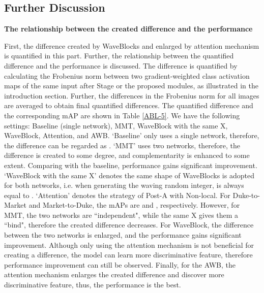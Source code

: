 \documentclass[journal]{IEEEtran}
\begin{document}
\subsection{Further Discussion}
\textbf{The relationship between the created difference and the performance}\par 
First, the difference created by WaveBlocks and enlarged by attention mechanism is quantified in this part.  Further, the relationship between the quantified difference and the performance is discussed. The difference is quantified by calculating the Frobenius norm between two gradient-weighted class activation maps \cite{selvaraju2017grad} of the same input after Stage  or the proposed modules, as illustrated in the introduction section. Further, the differences in the Frobenius norm for all images are averaged to obtain final quantified differences.  The quantified difference and the corresponding mAP are shown in Table  \ref{ABL-5}.  
We have the following settings: Baseline (single network), MMT, WaveBlock with the same X, WaveBlock, Attention, and AWB.  `Baseline' only uses a single network, therefore, the difference can be regarded as .  `MMT' uses two networks, therefore, the difference is created to some degree, and complementarity is enhanced to some extent. Comparing with the baseline, performance gains significant improvement.  `WaveBlock with the same X' denotes the same shape of WaveBlocks is adopted for both networks, i.e. when generating the waving random integer,  is always equal to .  `Attention' denotes the strategy of Post-A with Non-local. For Duke-to-Market and Market-to-Duke, the mAPs are  and , respectively. However, for MMT, the two networks are ``independent", while the same X gives them a ``bind", therefore the created difference decreases. For WaveBlock, the difference between the two networks is enlarged,  and the performance gains significant improvement. Although only using the attention mechanism is not beneficial for creating a difference, the model can learn more discriminative feature, therefore performance improvement can still be observed.  Finally, for the AWB, the attention mechanism enlarges the created difference and discover more discriminative feature, thus, the performance is the best.
\end{document}
